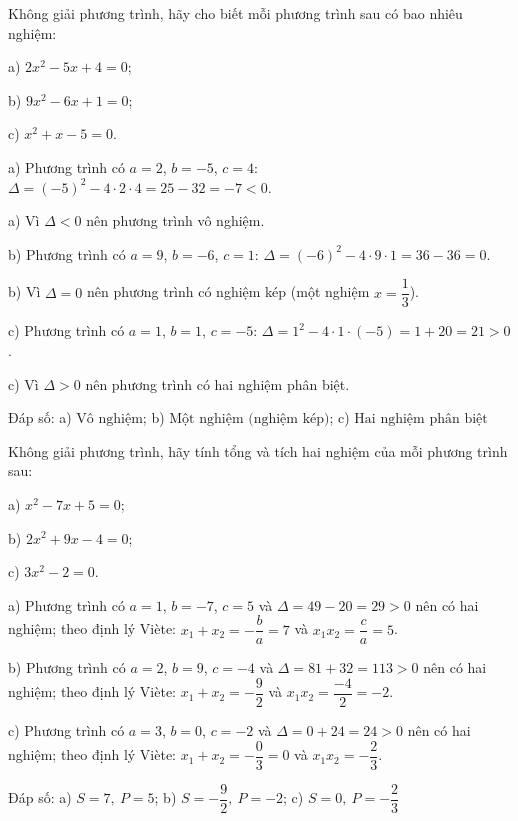\begin{problem}[9DS-PT2-035]
Không giải phương trình, hãy cho biết mỗi phương trình sau có bao nhiêu nghiệm:

a) $2x^2 - 5x + 4 = 0$;

b) $9x^2 - 6x + 1 = 0$;

c) $x^2 + x - 5 = 0$.

\begin{solution}
a) Phương trình có $a = 2$, $b = -5$, $c = 4$: $\Delta = (-5)^2 - 4 \cdot 2 \cdot 4 = 25 - 32 = -7 < 0$.

a) Vì $\Delta < 0$ nên phương trình vô nghiệm.

b) Phương trình có $a = 9$, $b = -6$, $c = 1$: $\Delta = (-6)^2 - 4 \cdot 9 \cdot 1 = 36 - 36 = 0$.

b) Vì $\Delta = 0$ nên phương trình có nghiệm kép (một nghiệm $x = \dfrac{1}{3}$).

c) Phương trình có $a = 1$, $b = 1$, $c = -5$: $\Delta = 1^2 - 4 \cdot 1 \cdot (-5) = 1 + 20 = 21 > 0$.

c) Vì $\Delta > 0$ nên phương trình có hai nghiệm phân biệt.

Đáp số: a) $\boxed{\text{Vô nghiệm}}$; b) $\boxed{\text{Một nghiệm (nghiệm kép)}}$; c) $\boxed{\text{Hai nghiệm phân biệt}}$
\end{solution}
\end{problem}

\begin{problem}[9DS-PT2-036]
Không giải phương trình, hãy tính tổng và tích hai nghiệm của mỗi phương trình sau:

a) $x^2 - 7x + 5 = 0$;

b) $2x^2 + 9x - 4 = 0$;

c) $3x^2 - 2 = 0$.

\begin{solution}
a) Phương trình có $a = 1$, $b = -7$, $c = 5$ và $\Delta = 49 - 20 = 29 > 0$ nên có hai nghiệm; theo định lý Viète: $x_1 + x_2 = -\dfrac{b}{a} = 7$ và $x_1x_2 = \dfrac{c}{a} = 5$.

b) Phương trình có $a = 2$, $b = 9$, $c = -4$ và $\Delta = 81 + 32 = 113 > 0$ nên có hai nghiệm; theo định lý Viète: $x_1 + x_2 = -\dfrac{9}{2}$ và $x_1x_2 = \dfrac{-4}{2} = -2$.

c) Phương trình có $a = 3$, $b = 0$, $c = -2$ và $\Delta = 0 + 24 = 24 > 0$ nên có hai nghiệm; theo định lý Viète: $x_1 + x_2 = -\dfrac{0}{3} = 0$ và $x_1x_2 = -\dfrac{2}{3}$.

Đáp số: a) $\boxed{S = 7,\ P = 5}$; b) $\boxed{S = -\dfrac{9}{2},\ P = -2}$; c) $\boxed{S = 0,\ P = -\dfrac{2}{3}}$
\end{solution}
\end{problem}

